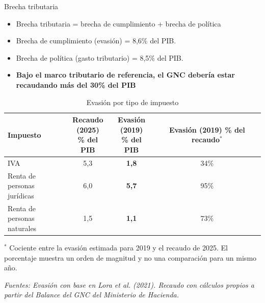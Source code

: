 \begin{frame}{Brecha tributaria}
\begin{itemize}
    \item Brecha tributaria = brecha de cumplimiento + brecha de política
    \item Brecha de cumplimiento (evasión) = 8,6\% del PIB.
    \item Brecha de política (gasto tributario) = 8,5\% del PIB.
    \item \textbf{Bajo el marco tributario de referencia, el GNC debería estar recaudando más del 30\% del PIB}
\end{itemize}
\end{frame}

\begin{frame}
\begin{table}[htbp]
\centering
\caption{Evasión por tipo de impuesto}
\label{tab:evasion_recaudo}
\large
\setlength{\tabcolsep}{7pt}
\renewcommand{\arraystretch}{1.22}
\begin{tabular}{lccc}
\toprule
Impuesto
& \shortstack{Recaudo\\(2025)\\\% del PIB}
& \shortstack{Evasión\\(2019)\\\% del PIB}
& \shortstack{Evasión\\(2019)\\\% del recaudo$^{*}$} \\
\midrule
IVA & 5,3 & \textbf{1,8} & 34\% \\
\shortstack[l]{Renta de personas\\jurídicas} & 6,0 & \textbf{5,7} & 95\% \\
\shortstack[l]{Renta de personas\\naturales} & 1,5 & \textbf{1,1} & 73\% \\
\bottomrule
\end{tabular}
\vspace{0.35cm}

\par\scriptsize{$^{*}$ Cociente entre la evasión estimada para 2019 y el recaudo de 2025. El porcentaje muestra un orden de magnitud y no una comparación para un mismo año.}

\vspace{0.12cm}
\par\scriptsize{\textit{Fuentes: Evasión con base en Lora et al. (2021). Recaudo con cálculos propios a partir del Balance del GNC del Ministerio de Hacienda.}}
\end{table}


\end{frame}

